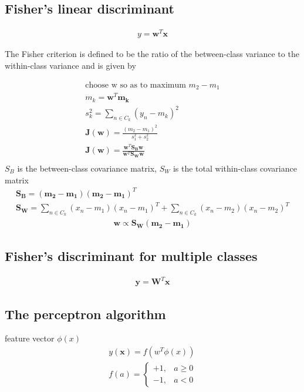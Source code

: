 \documentclass[a4paper]{article}
\begin{document}
\subsection{Fisher’s linear discriminant}

\begin{align}
y = \mathbf{w}^T \mathbf{x}
\end{align}

The Fisher criterion is defined to be the ratio of the between-class variance to
 the within-class variance and is given by

\begin{align}
\text{choose w so as to maximum } m_2 - m_1\\
m_k = \mathbf{w}^T \mathbf{m_k}\\
s_k^2 = \displaystyle\sum_{n \in C_k}(y_n - m_k)^2\\
\mathbf{J}(\mathbf{w}) = \frac{(m_2 - m_1)^2}{s_1^2+s_2^2}\\
\mathbf{J}(\mathbf{w}) = \frac{\mathbf{w}^T \mathbf{S_B} \mathbf{w}}
  {\mathbf{w}^T \mathbf{S_W} \mathbf{w}}
\\
\end{align}
$S_B$ is the between-class covariance matrix,
 $S_W$ is the total within-class covariance matrix
\begin{align}
\mathbf{S_B} = (\mathbf{m_2} - \mathbf{m_1})(\mathbf{m_2} - \mathbf{m_1})^T\\
\mathbf{S_W} = \displaystyle\sum_{n \in C_k}(x_n - m_1) (x_n - m_1)^T +
\displaystyle\sum_{n \in C_k}(x_n - m_2) (x_n - m_2)^T
\end{align}
\begin{align}
\mathbf{w} \propto  \mathbf{S_W} (\mathbf{m_2} - \mathbf{m_1})
\end{align}

\subsection{Fisher’s discriminant for multiple classes}
\begin{align}
\mathbf{y} = \mathbf{W}^T \mathbf{x}
\end{align}

\subsection{The perceptron algorithm}
feature vector $\phi(x)$
\begin{align}
y(\mathbf{x}) = f(w^T\phi(x))\\
f(a) =
  \begin{cases}
   +1, & a \geq 0 \\
   -1, & a < 0
  \end{cases}
\end{align}
\end{document}
